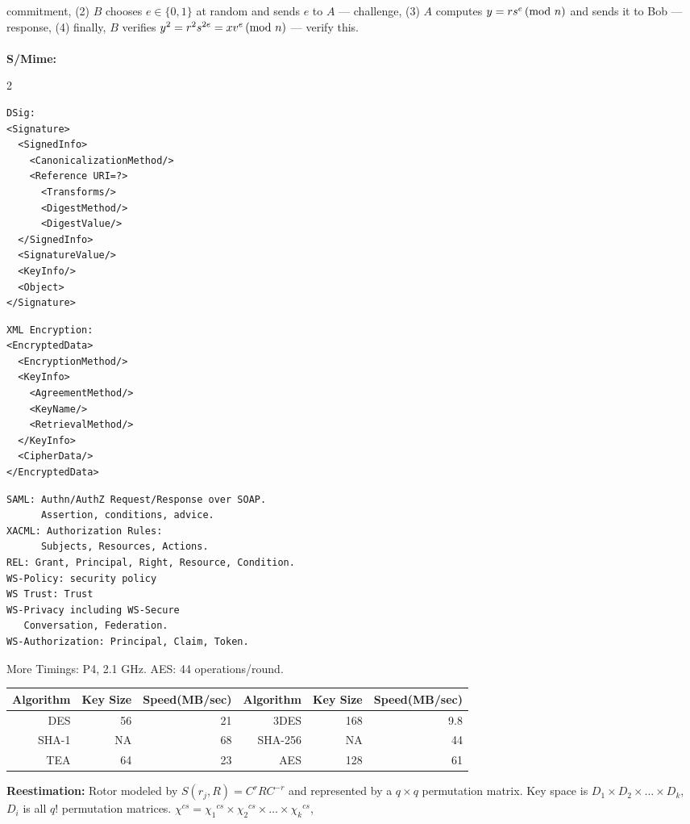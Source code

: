 commitment, (2) $B$ chooses $e \in \{ 0, 1 \}$ at random and sends $e$ to $A$ --- challenge, (3)
$A$ computes $y= rs^e \thinspace \textnormal{(mod } n \textnormal{)}$ and sends it to Bob --- response, (4) finally, $B$ verifies
$y^2= r^2 s^{2e} = xv^e \thinspace \textnormal{(mod } n \textnormal{)}$ --- verify this.
\\
\\
{\bf S/Mime:} 
\begin{multicols} {2} {
\begin{verbatim}
DSig:
<Signature>
  <SignedInfo>
    <CanonicalizationMethod/>
    <Reference URI=?>
      <Transforms/>
      <DigestMethod/>
      <DigestValue/>
  </SignedInfo>
  <SignatureValue/>
  <KeyInfo/>
  <Object>
</Signature>
\end{verbatim}

\begin{verbatim}
XML Encryption:
<EncryptedData>
  <EncryptionMethod/>
  <KeyInfo>
    <AgreementMethod/>
    <KeyName/>
    <RetrievalMethod/>
  </KeyInfo>
  <CipherData/>
</EncryptedData>
\end{verbatim}

\begin{verbatim}
SAML: Authn/AuthZ Request/Response over SOAP.  
      Assertion, conditions, advice.
XACML: Authorization Rules: 
      Subjects, Resources, Actions.
REL: Grant, Principal, Right, Resource, Condition.
WS-Policy: security policy
WS Trust: Trust
WS-Privacy including WS-Secure 
   Conversation, Federation.
WS-Authorization: Principal, Claim, Token.
\end{verbatim}
}
\end{multicols}
More Timings: P4, 2.1 GHz.  AES: 44 operations/round.
\begin{center}
\begin{tabular} {|rrr|rrr|}
\hline
{\bf Algorithm} & {\bf Key Size} & {\bf Speed(MB/sec)} & {\bf Algorithm} & {\bf Key Size} & {\bf Speed(MB/sec)} \\
\hline
DES & 56 & 21 & 3DES & 168 & 9.8 \\
SHA-1 & NA & 68 & SHA-256 & NA & 44 \\
TEA & 64 & 23 & AES & 128 & 61 \\
\hline
\end{tabular}
\end{center}
{\bf Reestimation:} Rotor modeled by $S(r_j , R)= C^r R C^{-r}$ and represented by a
$q \times q$ permutation matrix.  Key space is $D_1 \times D_2 \times \ldots \times D_k$,
$D_i$ is all $q!$ permutation matrices.
$\chi^{cs} = {\chi_1}^{cs} \times {\chi_2}^{cs} \times \ldots \times {\chi_k}^{cs}$,
